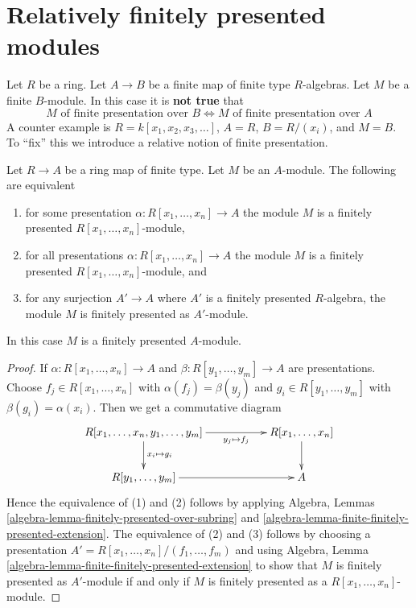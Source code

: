 \section{Relatively finitely presented modules}
\label{section-relative-finite-presentation}

\noindent
Let $R$ be a ring. Let $A \to B$ be a finite map of finite type $R$-algebras.
Let $M$ be a finite $B$-module. In this case it is {\bf not true} that
$$
M\text{ of finite presentation over }B
\Leftrightarrow
M\text{ of finite presentation over }A
$$
A counter example is $R = k[x_1, x_2, x_3, \ldots]$, $A = R$, $B = R/(x_i)$,
and $M = B$. To ``fix'' this we introduce a relative notion of finite
presentation.

\begin{lemma}
\label{lemma-relatively-finitely-presented}
Let $R \to A$ be a ring map of finite type.
Let $M$ be an $A$-module.
The following are equivalent
\begin{enumerate}
\item for some presentation $\alpha : R[x_1, \ldots, x_n] \to A$
the module $M$ is a finitely presented $R[x_1, \ldots, x_n]$-module,
\item for all presentations $\alpha : R[x_1, \ldots, x_n] \to A$
the module $M$ is a finitely presented $R[x_1, \ldots, x_n]$-module, and
\item for any surjection $A' \to A$ where $A'$ is a finitely presented
$R$-algebra, the module $M$ is finitely presented as $A'$-module.
\end{enumerate}
In this case $M$ is a finitely presented $A$-module.
\end{lemma}

\begin{proof}
If $\alpha : R[x_1, \ldots, x_n] \to A$ and
$\beta : R[y_1, \ldots, y_m] \to A$ are presentations.
Choose $f_j \in R[x_1, \ldots, x_n]$ with $\alpha(f_j) = \beta(y_j)$
and $g_i \in R[y_1, \ldots, y_m]$ with $\beta(g_i) = \alpha(x_i)$.
Then we get a commutative diagram
$$
\xymatrix{
R[x_1, \ldots, x_n, y_1, \ldots, y_m]
\ar[d]^{x_i \mapsto g_i} \ar[rr]_-{y_j \mapsto f_j} & &
R[x_1, \ldots, x_n] \ar[d] \\
R[y_1, \ldots, y_m] \ar[rr] & & A
}
$$
Hence the equivalence of (1) and (2) follows by applying
Algebra, Lemmas \ref{algebra-lemma-finitely-presented-over-subring} and
\ref{algebra-lemma-finite-finitely-presented-extension}.
The equivalence of (2) and (3) follows by choosing a presentation
$A' = R[x_1, \ldots, x_n]/(f_1, \ldots, f_m)$ and using
Algebra, Lemma \ref{algebra-lemma-finite-finitely-presented-extension}
to show that $M$ is finitely presented as $A'$-module if and only if
$M$ is finitely presented as a $R[x_1, \ldots, x_n]$-module.
\end{proof}

